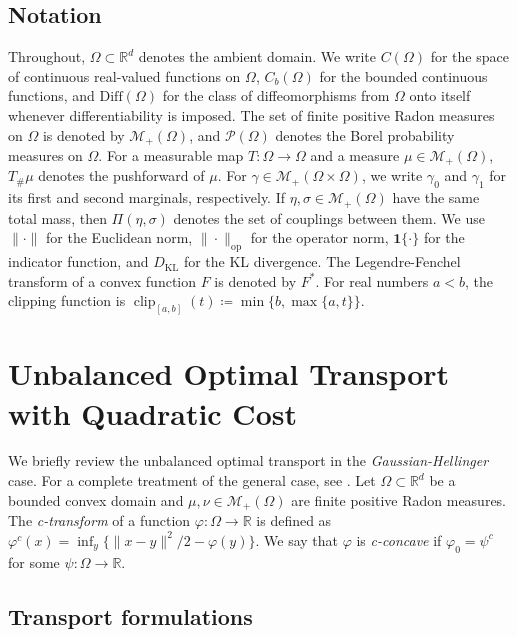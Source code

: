 \documentclass[11pt,reqno]{amsart}
\theoremstyle{definition}
\newcommand{\R}{\mathbb{R}}
\newcommand{\KL}{\mathrm{KL}}
\newcommand{\mM}{\mathcal{M}}
\newcommand{\mP}{\mathcal{P}}
\DeclareMathOperator{\clip}{clip}
\begin{document}
\subsection{Notation}
Throughout, $\Omega\subset\R^d$ denotes the ambient domain. We write $C(\Omega)$ for the space of continuous real-valued functions on $\Omega$, $C_b(\Omega)$ for the bounded continuous functions, and $\mathrm{Diff}(\Omega)$ for the class of diffeomorphisms from $\Omega$ onto itself whenever differentiability is imposed. The set of finite positive Radon measures on $\Omega$ is denoted by $\mM_+(\Omega)$, and $\mP(\Omega)$ denotes the Borel probability measures on $\Omega$. For a measurable map $T:\Omega\to\Omega$ and a measure $\mu\in\mM_+(\Omega)$, $T_{\#}\mu$ denotes the pushforward of $\mu$. For $\gamma\in\mM_+(\Omega\times\Omega)$, we write $\gamma_0$ and $\gamma_1$ for its first and second marginals, respectively. If $\eta,\sigma\in\mM_+(\Omega)$ have the same total mass, then $\Pi(\eta,\sigma)$ denotes the set of couplings between them. We use $\|\cdot\|$ for the Euclidean norm, $\|\cdot\|_{\mathrm{op}}$ for the operator norm, $\mathbf{1}\{\cdot\}$ for the indicator function, and $D_\KL$ for the KL divergence. The Legendre-Fenchel transform of a convex function $F$ is denoted by $F^*$. 
For real numbers $a<b$, the clipping function is $\clip_{[a,b]}(t)\coloneqq\min\{b,\max\{a,t\}\}$.

\section{Unbalanced Optimal Transport with Quadratic Cost} \label{sec:setup}

We briefly review the unbalanced optimal transport in the \textit{Gaussian-Hellinger} case. For a complete treatment of the general case, see \cite{LieroMielkeSavare2018,savare2024relaxation,gallouet2025regularity}.
Let $\Omega\subset\R^d$ be a bounded convex domain and $\mu,\nu\in\mM_+(\Omega)$ are finite positive Radon measures. The \emph{c-transform} of a function $\varphi:\Omega \to \R$ is defined as $\varphi^c(x) =\inf_y \{ \|x-y\|^2/2 - \varphi(y) \}$. We say that $\varphi$ is \emph{c-concave} if $\varphi_0=\psi^c$ for some $\psi: \Omega \to \R$.



\subsection{Transport formulations}
\end{document}
